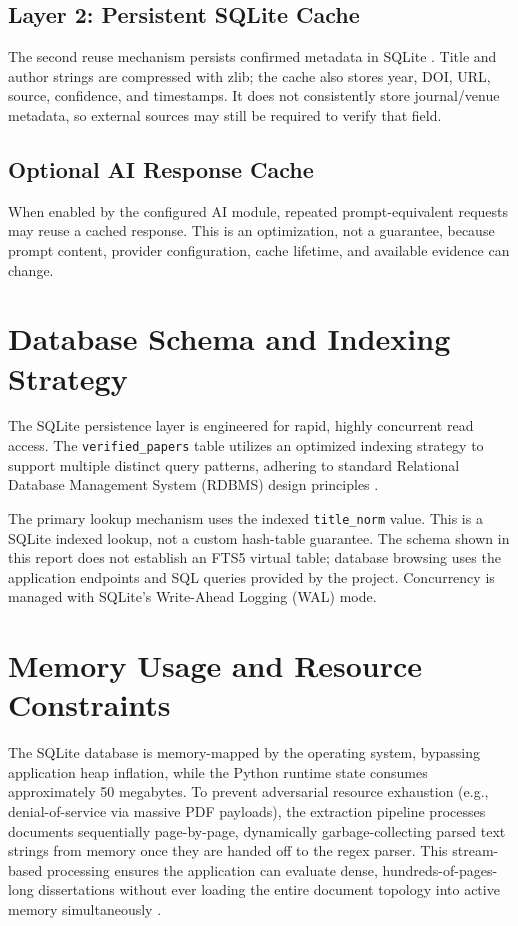 \documentclass[12pt,a4paper,oneside]{report}
\begin{document}
\subsection{Layer 2: Persistent SQLite Cache}
The second reuse mechanism persists confirmed metadata in SQLite \cite{sqlite2026}. Title and author strings are compressed with zlib; the cache also stores year, DOI, URL, source, confidence, and timestamps. It does not consistently store journal/venue metadata, so external sources may still be required to verify that field.

\subsection{Optional AI Response Cache}
When enabled by the configured AI module, repeated prompt-equivalent requests may reuse a cached response. This is an optimization, not a guarantee, because prompt content, provider configuration, cache lifetime, and available evidence can change.

\section{Database Schema and Indexing Strategy}

The SQLite persistence layer is engineered for rapid, highly concurrent read access. The \texttt{verified\_papers} table utilizes an optimized indexing strategy to support multiple distinct query patterns, adhering to standard Relational Database Management System (RDBMS) design principles \cite{silberschatz2020}.

The primary lookup mechanism uses the indexed \texttt{title\_norm} value. This is a SQLite indexed lookup, not a custom hash-table guarantee. The schema shown in this report does not establish an FTS5 virtual table; database browsing uses the application endpoints and SQL queries provided by the project. Concurrency is managed with SQLite's Write-Ahead Logging (WAL) mode.

\section{Memory Usage and Resource Constraints}

The SQLite database is memory-mapped by the operating system, bypassing application heap inflation, while the Python runtime state consumes approximately 50 megabytes. To prevent adversarial resource exhaustion (e.g., denial-of-service via massive PDF payloads), the extraction pipeline processes documents sequentially page-by-page, dynamically garbage-collecting parsed text strings from memory once they are handed off to the regex parser. This stream-based processing ensures the application can evaluate dense, hundreds-of-pages-long dissertations without ever loading the entire document topology into active memory simultaneously \cite{silberschatz2020}.
\end{document}
